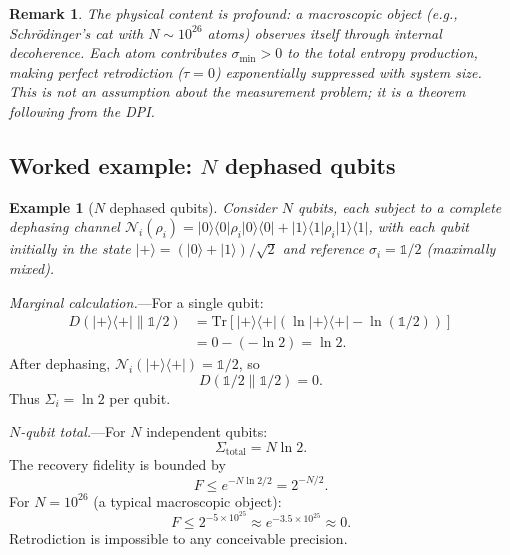 \documentclass[letterpaper,twocolumn,superscriptaddress,longbibliography]{revtex4-2}
\newtheorem*{remark}{Remark}
\newtheorem{example}{Example}[section]
\newcommand{\Tr}{\mathrm{Tr}}
\newcommand{\chan}{\mathcal{N}}
\newcommand{\ket}[1]{|#1\rangle}
\newcommand{\bra}[1]{\langle#1|}
\newcommand{\tauasym}{\tau}
\begin{document}
\begin{remark}
The physical content is profound: a macroscopic object
(e.g., Schr\"{o}dinger's cat with $N \sim 10^{26}$ atoms)
\emph{observes itself} through internal decoherence.
Each atom contributes $\sigma_{\min} > 0$ to the total
entropy production, making perfect retrodiction
($\tauasym = 0$) exponentially suppressed with system size.
This is not an assumption about the measurement problem; it is a
\emph{theorem} following from the DPI.
\end{remark}

\subsection{Worked example: $N$ dephased qubits}

\begin{example}[$N$ dephased qubits]
\label{ex:N_qubits}
Consider $N$ qubits, each subject to a complete dephasing channel
$\chan_i(\rho_i) = \ket{0}\!\bra{0}\rho_i\ket{0}\!\bra{0}
+ \ket{1}\!\bra{1}\rho_i\ket{1}\!\bra{1}$,
with each qubit initially in the state
$\ket{+} = (\ket{0}+\ket{1})/\sqrt{2}$ and reference
$\sigma_i = \mathbb{1}/2$ (maximally mixed).
\end{example}

\emph{Marginal calculation.}---For a single qubit:
\begin{align}
  D(\ket{+}\!\bra{+} \| \mathbb{1}/2)
  &= \Tr[\ket{+}\!\bra{+}(\ln\ket{+}\!\bra{+} - \ln(\mathbb{1}/2))]
  \nonumber \\
  &= 0 - (-\ln 2) = \ln 2.
  \label{eq:D_input_qubit}
\end{align}
After dephasing, $\chan_i(\ket{+}\!\bra{+}) = \mathbb{1}/2$, so
\begin{equation}
  D(\mathbb{1}/2 \| \mathbb{1}/2) = 0.
  \label{eq:D_output_qubit}
\end{equation}
Thus $\Sigma_i = \ln 2$ per qubit.

\emph{$N$-qubit total.}---For $N$ independent qubits:
\begin{equation}
  \Sigma_{\mathrm{total}} = N \ln 2.
  \label{eq:Sigma_N}
\end{equation}
The recovery fidelity is bounded by
\begin{equation}
  F \leq e^{-N\ln 2/2} = 2^{-N/2}.
  \label{eq:F_N}
\end{equation}
For $N = 10^{26}$ (a typical macroscopic object):
\begin{equation}
  F \leq 2^{-5\times 10^{25}}
  \approx e^{-3.5 \times 10^{25}}
  \approx 0.
  \label{eq:F_macro}
\end{equation}
Retrodiction is impossible to any conceivable precision.
\end{document}
